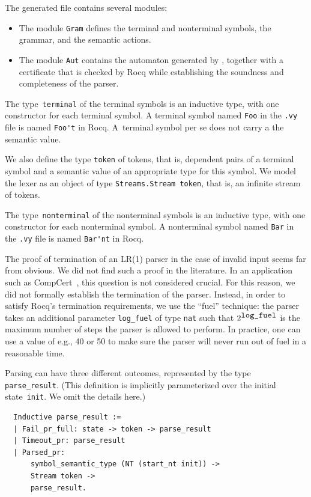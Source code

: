 \documentclass[onecolumn,11pt,nocopyrightspace,preprint]{sigplanconf}
\begin{document}
The generated file contains several modules:

\begin{itemize}
\item The module \verb+Gram+ defines the terminal and
  nonterminal symbols, the grammar, and the semantic actions.
\item The module \verb+Aut+ contains the automaton
  generated by \menhir, together with a certificate that is checked by Rocq
  while establishing the soundness and completeness of the parser.
\end{itemize}

The type~\verb+terminal+ of the terminal symbols is an inductive type, with
one constructor for each terminal symbol. A terminal symbol named \verb+Foo+
in the \verb+.vy+ file is named \verb+Foo't+ in Rocq. A~terminal symbol per se
does not carry a the semantic value.

We also define the type \verb+token+ of tokens, that is, dependent pairs of a
terminal symbol and a semantic value of an appropriate type for this symbol.
We model the lexer as an object of type \verb+Streams.Stream token+, that is,
an infinite stream of tokens.

The type~\verb+nonterminal+ of the nonterminal symbols is an inductive type,
with one constructor for each nonterminal symbol. A nonterminal symbol named
\verb+Bar+ in the \verb+.vy+ file is named \verb+Bar'nt+ in Rocq.

The proof of termination of an LR(1) parser in the case of invalid input seems
far from obvious. We did not find such a proof in the literature. In an
application such as CompCert~\cite{compcert}, this question is not considered
crucial. For this reason, we did not formally establish the termination of the
parser. Instead, in order to satisfy Rocq's termination requirements, we use
the ``fuel'' technique: the parser takes an additional parameter
\verb+log_fuel+ of type \verb+nat+ such that $2^{\verb+log_fuel+}$ is the
maximum number of steps the parser is allowed to perform. In practice, one
can use a value of e.g., 40 or 50 to make sure the parser will never run out
of fuel in a reasonable time.

Parsing can have three different outcomes, represented by the type
\verb+parse_result+.
%
(This definition is implicitly parameterized over the initial
state~\verb+init+. We omit the details here.)
%
\begin{verbatim}
  Inductive parse_result :=
  | Fail_pr_full: state -> token -> parse_result
  | Timeout_pr: parse_result
  | Parsed_pr:
      symbol_semantic_type (NT (start_nt init)) ->
      Stream token ->
      parse_result.
\end{verbatim}
\end{document}
